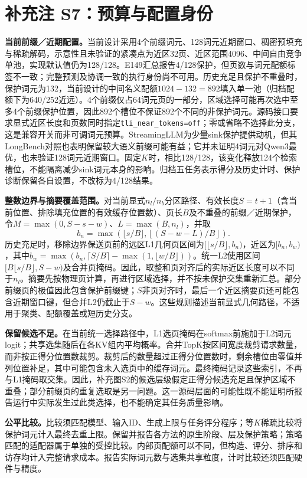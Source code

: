 \documentclass[10pt,letterpaper]{article}
\begin{document}
\section*{补充注 S7：预算与配置身份}
\textbf{当前前缀／近期配置。}当前设计采用4个前缀词元、128词元近期窗口、稠密预填充与稀疏解码，示意性且未验证的紧凑点为近区32页、近区范围4096、中间自由竞争单池，实现默认值仍为128/128。E149汇总报告4/128保护，但页数与词元配额标签不一致；完整预测及协调一致的执行身份尚不可用。历史充足且保护不重叠时，保护词元为132，当前设计的中间名义配额$1024-132=892$填入单一池（归档配额下为640/252近远）。4个前缀仅占64词元页的一部分，区域选择可能再次选中至多4个前缀保护位置，因此892个槽位不保证892个不同的非保护词元。源码接口要求显式近区长度和页数同时指定\texttt{tli\_near\_tokens=off}；零或省略不选择此分支，这是兼容开关而非可调词元预算。StreamingLLM为少量sink保护提供动机，但其LongBench对照也表明保留较大语义前缀可能有益；它并未证明4词元对Qwen3最优，也未验证128词元近期窗口。固定$K$时，相比128/128，该变化释放124个检索槽位，不能隔离减少sink词元本身的影响。归档五任务表示得分及历史计时、保护诊断保留各自设置，不改标为4/128结果。

\textbf{整数边界与摘要覆盖范围。}对当前显式$n_l/n_b$分区路径、有效长度$S=t+1$（含当前位置、排除填充位置的有效缓存位置数）、页长$B$及不重叠的前缀／近期保护，令$M=\max(0,S-s-w)$、$L=\max(B,n_l)$，并取
\[
b_n=\max\!\left(\lfloor s/B\rfloor,\left\lfloor(S-w-L)/B\right\rfloor\right).
\]
历史充足时，移除边界保送页前的远区L1几何页区间为$[\lfloor s/B\rfloor,b_n)$，近区为$[b_n,b_w)$，其中$b_w=\max(b_n,\lceil S/B\rceil-\max(1,\lfloor w/B\rfloor))$。统一L2使用区间$[B\lfloor s/B\rfloor,S-w)$及合并页掩码。因此，取整和页对齐后的实际近区长度可以不同于$n_l$。摘要先按物理页计算，再进行区域选择，并不按未保护交集重新汇总。部分前缀页的极值因此包含保护前缀键；$S$非页对齐时，最后一个近区摘要页还可能包含近期窗口键，但合并L2仍截止于$S-w$。这些规则描述当前显式几何路径，不适用于聚类、配额覆盖或短历史分支。

\textbf{保留候选不足。}在当前统一选择路径中，L1选页掩码在softmax前施加于L2词元logit；共享选集随后在各KV组内平均概率。合并TopK按区间宽度裁剪请求数量，而非按正得分位置数裁剪。裁剪后的数量超过正得分位置数时，剩余槽位由零值并列位置补足，其中可能包含未入选页中的缓存词元。最终掩码记录这些索引，不再与L1掩码取交集。因此，补充图S2的候选层级假定正得分候选充足且保护区域不重叠；部分前缀页的重复选取是另一问题。这一源码层面的可能性既不能证明所报告运行中实际发生过此类选择，也不能确定其任务质量影响。

\textbf{公平比较。}比较须匹配模型、输入ID、生成上限与任务评分程序；等$K$稀疏比较将保护词元计入最终去重上限。保留并报告各方法的原生阶段、层及保护策略；策略匹配的适配器属于单独的受控比较。内部页配额可以不同，但构造、评分、排序和访存均计入完整请求成本。报告实际词元数与选集共享粒度，计时比较还须匹配硬件与精度。
\end{document}
